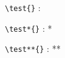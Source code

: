 \documentclass[10pt,a4paper]{article}
\makeatletter
\newcommand\test{\@ifstar{\@test@star}{\@test@nostar}}
\newcommand\@test@star{\@ifstar{\@test@star@star}{\@test@star@nostar}}
\newcommand{\@test@star@star}[1]{Two starred version No #1}
\newcommand{\@test@star@nostar}[1]{One starred version No #1}
\newcommand{\@test@nostar}[1]{Unstarred version No #1}
\makeatother
\begin{document}
\verb+\test{}+ : \test{}

\verb+\test*{}+ : \test*{}

\verb+\test**{}+ : \test**{}
\end{document}
